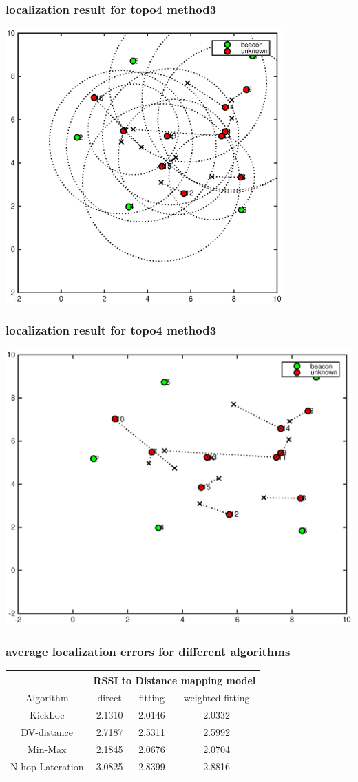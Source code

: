 \documentclass[11pt]{beamer}
\begin{document}
\begin{frame}
 \frametitle{localization result for topo4 method3}
\includegraphics[width=0.8\textwidth]{grass_final_mean_std_result_topo4_method3.eps} 
\end{frame}

\begin{frame}
 \frametitle{localization result for topo4 method3}
\includegraphics[width=\textwidth]{grass_final_mean_result_topo4_method3.eps} 
\end{frame}


\begin{frame}
\frametitle{average localization errors for different algorithms }
\begin{tabular}{|c|c|c|c|}
\hline 
 & \multicolumn{3}{c|}{RSSI to Distance mapping model} \\ 
\hline 
Algorithm & direct  & fitting & weighted fitting \\ 
\hline 
KickLoc & 2.1310 & 2.0146 & 2.0332 \\
\hline 
DV-distance & 2.7187 & 2.5311 & 2.5992  \\
\hline
Min-Max & 2.1845  &  2.0676  &  2.0704  \\
\hline
N-hop Lateration & 3.0825  &  2.8399  & 2.8816  \\
\hline
\end{tabular} 
\end{frame}
\end{document}
